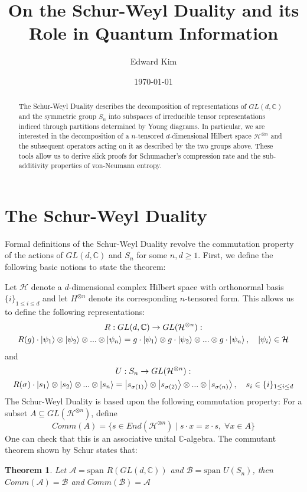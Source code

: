 \documentclass[12pt]{article}%
\newtheorem{thm}{Theorem}
\begin{document}
\title{On the Schur-Weyl Duality and its Role in Quantum Information}
\author{Edward Kim}
\date{\today}
\maketitle
\begin{abstract}
  The Schur-Weyl Duality describes the decomposition of representations of $GL(d,\mathbb{C})$ and the symmetric group $S_n$ into subspaces of irreducible tensor representations indiced through partitions determined by Young diagrams. In particular, we are interested in the decomposition of a $n$-tensored $d$-dimensional Hilbert space $\mathcal{H}^{\otimes n}$ and the subsequent operators acting on it as described by the two groups above. These tools allow us to derive slick proofs for Schumacher's compression rate and the sub-additivity properties of von-Neumann entropy.
\end{abstract}

\tableofcontents
\newpage

\section{The Schur-Weyl Duality}

Formal definitions of the Schur-Weyl Duality revolve the commutation property of the actions of $GL(d,\mathbb{C})$ and $S_n$ for some $n,d \geq 1$. First, we define the following basic notions to state the theorem: \newline

Let $\mathcal{H}$ denote a $d$-dimensional complex Hilbert space with orthonormal basis $\{i\}_{1 \leq i \leq d}$ and let $H^{\otimes n}$ denote its corresponding $n$-tensored form.
This allows us to define the following representations:
\begin{gather*}
  R: GL(d,\mathbb{C}) \rightarrow GL(\mathcal{H}^{\otimes n}): \\
  R(g) \cdot \ket{\psi_1} \otimes \ket{\psi_2} \otimes ... \otimes \ket{\psi_n} = g \cdot \ket{\psi_1} \otimes g \cdot \ket{\psi_2} \otimes ... \otimes g \cdot \ket{\psi_n}, \quad \ket{\psi_i} \in \mathcal{H}
\end{gather*}
and
\begin{gather*}
  U: S_n \rightarrow GL(\mathcal{H}^{\otimes n}): \\
  R(\sigma) \cdot \ket{s_1} \otimes \ket{s_2} \otimes ... \otimes \ket{s_n} = \ket{s_{\sigma(1)}} \otimes \ket{s_{\sigma(2)}} \otimes ... \otimes  \ket{s_{\sigma(n)}}, \quad s_i \in \{i\}_{1 \leq i \leq d}
\end{gather*}
The Schur-Weyl Duality is based upon the following commutation property: For a subset $A \subseteq GL(\mathcal{H}^{\otimes n})$, define
$$ Comm(A) = \{s \in End(\mathcal{H}^{\otimes n})\mid s \cdot x = x \cdot s, \; \forall x \in A \} $$
One can check that this is an associative unital $\mathbb{C}$-algebra. The commutant theorem shown by Schur states that:
\begin{thm}
  Let $\mathcal{A} = \text{span }{R(GL(d,\mathbb{C}))}$ and $\mathcal{B} = \text{span }U(S_n)$, then $Comm(\mathcal{A}) = \mathcal{B}$ and $Comm(\mathcal{B}) = \mathcal{A}$
\end{thm}
\end{document}
